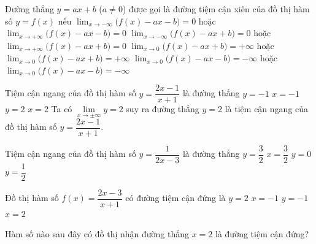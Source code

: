 \begin{ex}
\begin{ex}
\end{ex}
\begin{ex}%
 Đường thẳng $y = ax + b$ ($a \neq 0$) được gọi là đường tiệm cận xiên của đồ thị hàm số $y = f(x)$ nếu
 \choice
 {\True $\displaystyle\lim_{x\to -\infty }\big(f(x)-ax-b\big)=0$ hoặc $\displaystyle\lim_{x\to +\infty }\big(f(x)-ax-b\big)=0$}
 {$\displaystyle\lim_{x\to -\infty }\big(f(x)-ax+b\big)=0$ hoặc $\displaystyle\lim_{x\to +\infty }\big(f(x)-ax+b\big)=0$}
 {$\displaystyle\lim_{x\to 0 }\big(f(x)-ax+b\big)=+\infty$ hoặc $\displaystyle\lim_{x\to 0 }\big(f(x)-ax+b\big)=+\infty$}
 {$\displaystyle\lim_{x\to 0 }\big(f(x)-ax-b\big)=-\infty$ hoặc $\displaystyle\lim_{x\to 0 }\big(f(x)-ax-b\big)=-\infty$}
\end{ex}
\begin{ex}
 Tiệm cận ngang của đồ thị hàm số $ y=\dfrac{2x-1}{x+1} $ là đường thẳng
 \choice
 {$y=-1$}
 {$ x=-1 $}
 {\True $ y=2 $}
 {$ x=2 $}
 \loigiai
 {
 Ta có $ \lim\limits_{x\to \pm\infty}y=2$ suy ra đường thẳng $ y=2 $ là tiệm cận ngang của đồ thị hàm số $ y=\dfrac{2x-1}{x+1} $.
 }
\end{ex}
\begin{ex}
 Tiệm cận ngang của đồ thị hàm số $y=\dfrac{1}{2x-3}$ là đường thẳng
 \choice
 {$y=\dfrac{3}{2}$}
 {$x=\dfrac{3}{2}$}
 {\True $y=0$}
 {$y=\dfrac{1}{2}$}
\end{ex}
\begin{ex}
 Đồ thị hàm số $f(x)=\dfrac{2x-3}{x+1}$ có đường tiệm cận đứng là
 \choice
 {$y=2$}
 {\True $x=-1$}
 {$y=-1$}
 {$x=2$}
\end{ex}
\begin{ex}
 Hàm số nào sau đây có đồ thị nhận đường thẳng $x=2$ là đường tiệm cận đứng?

\end{ex}
\end{ex}
